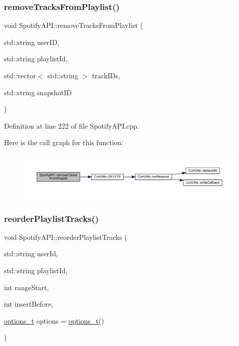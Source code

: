 \subsubsection{\texorpdfstring{remove\+Tracks\+From\+Playlist()}{removeTracksFromPlaylist()}}
{\footnotesize\ttfamily void Spotify\+A\+P\+I\+::remove\+Tracks\+From\+Playlist (\begin{DoxyParamCaption}\item[{std\+::string}]{user\+ID,  }\item[{std\+::string}]{playlist\+Id,  }\item[{std\+::vector$<$ std\+::string $>$}]{track\+I\+Ds,  }\item[{std\+::string}]{snapshot\+ID }\end{DoxyParamCaption})}



Definition at line 222 of file Spotify\+A\+P\+I.\+cpp.

Here is the call graph for this function\+:
\nopagebreak
\begin{figure}[H]
\begin{center}
\leavevmode
\includegraphics[width=350pt]{class_spotify_a_p_i_ae1ce0b86c79df5f09a8d752dffd512ec_cgraph}
\end{center}
\end{figure}
\mbox{\label{class_spotify_a_p_i_aa9fcff75e9b8067c482306f0af0fc519}} 
\subsubsection{\texorpdfstring{reorder\+Playlist\+Tracks()}{reorderPlaylistTracks()}}
{\footnotesize\ttfamily void Spotify\+A\+P\+I\+::reorder\+Playlist\+Tracks (\begin{DoxyParamCaption}\item[{std\+::string}]{user\+Id,  }\item[{std\+::string}]{playlist\+Id,  }\item[{int}]{range\+Start,  }\item[{int}]{insert\+Before,  }\item[{\mbox{\hyperlink{_spotify_a_p_i_8h_a0ff5cac1a4007bb330b7d9939650c283}{options\+\_\+t}}}]{options = {\ttfamily \mbox{\hyperlink{_spotify_a_p_i_8h_a0ff5cac1a4007bb330b7d9939650c283}{options\+\_\+t}}()} }\end{DoxyParamCaption})}



